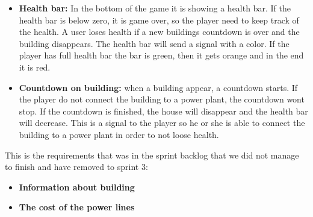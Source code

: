 \begin{itemize}
		\item {\bf Health bar:} In the bottom of the game it is showing a health bar. If the 
		health bar is below zero, it is game over, so the player need to keep track of the health.
		A user loses health if a new buildings countdown is over and the building disappears.
		The health bar will send a signal with a color. If the player has full health bar the bar is
		green, then it gets orange and in the end it is red. 

		\item {\bf Countdown on building:} when a building appear, a countdown starts. If the player
		do not connect the building to a power plant, the countdown wont stop. If the countdown is
		finished, the house will disappear and the health bar will decrease. This is a signal to
		the player so he or she is able to connect the building to a power plant in order to not loose
		health. 

	\end{itemize}

	This is the requirements that was in the sprint backlog that we did not
	manage to finish and have removed to sprint 3:

	\begin{itemize}
		\item {\bf Information about building}

		\item {\bf The cost of the power lines}

	\end{itemize}

